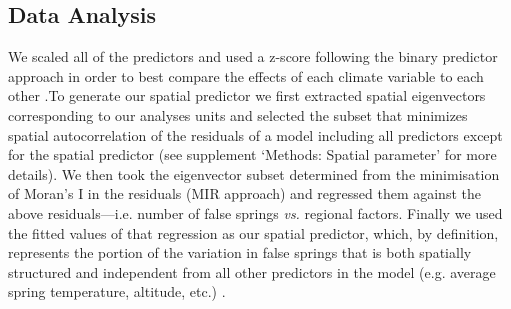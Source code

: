 \documentclass{article}\usepackage[]{graphicx}\usepackage[]{color}
\begin{document}
\subsection*{Data Analysis}
We scaled all of the predictors and used a z-score following the binary predictor approach in order to best compare the effects of each climate variable to each other \citep{Gelman2006}.To generate our spatial predictor we first extracted spatial eigenvectors corresponding to our analyses units and selected the subset that minimizes spatial autocorrelation of the residuals of a model including all predictors except for the spatial predictor \citep{diniz2012selection,Baumen2017} (see supplement `Methods: Spatial parameter' for more details). We then took the eigenvector subset determined from the minimisation of Moran’s I in the residuals (MIR approach) and regressed them against the above residuals---i.e. number of false springs \emph{vs.} regional factors. Finally we used the fitted values of that regression as our spatial predictor, which, by definition, represents the portion of the variation in false springs that is both spatially structured and independent from all other predictors in the model (e.g. average spring temperature, altitude, etc.) \citep{griffith2006spatial,morales2012imprint}. %
\end{document}
